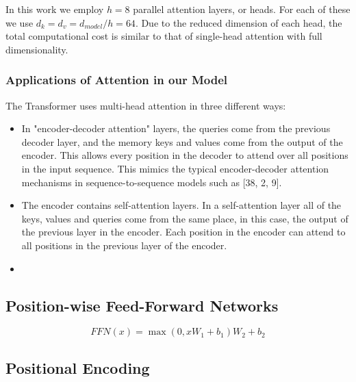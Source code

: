 \documentclass{article}
\begin{document}
\setlength{\parskip}{1em}
\noindent
In this work we employ $h = 8$ parallel attention layers, or heads. For each of these we use
$d_k = d_v = d_{model}/h = 64$. Due to the reduced dimension of each head, the total computational cost
is similar to that of single-head attention with full dimensionality.

\subsubsection{Applications of Attention in our Model}
The Transformer uses multi-head attention in three different ways:
\begin{itemize}
    \item In "encoder-decoder attention" layers, the queries come from the previous decoder layer,
    and the memory keys and values come from the output of the encoder. This allows every
    position in the decoder to attend over all positions in the input sequence. This mimics the
    typical encoder-decoder attention mechanisms in sequence-to-sequence models such as
    [38, 2, 9].
    \item The encoder contains self-attention layers. In a self-attention layer all of the keys, values
    and queries come from the same place, in this case, the output of the previous layer in the
    encoder. Each position in the encoder can attend to all positions in the previous layer of the
    encoder.
    \item 
\end{itemize}

\subsection{Position-wise Feed-Forward Networks}

\begin{equation}
    FFN(x) = \max(0, xW_1 + b_1)W_2 + b_2
\end{equation}

\subsection{Positional Encoding}
\end{document}
